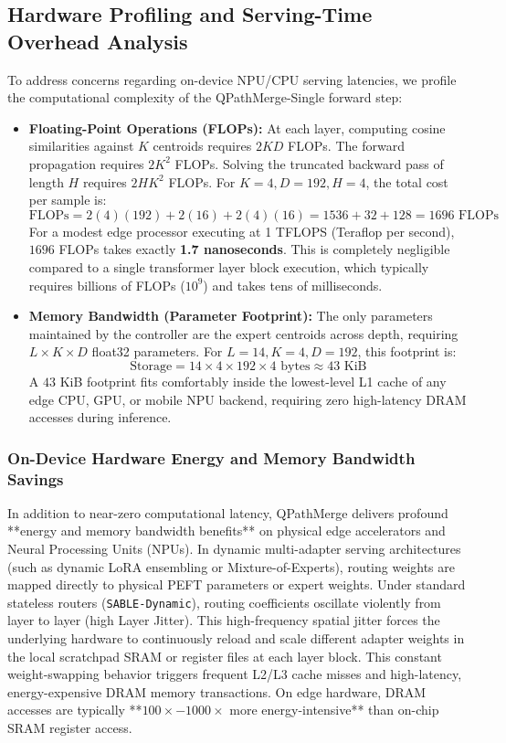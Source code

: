 \subsection{Hardware Profiling and Serving-Time Overhead Analysis}
To address concerns regarding on-device NPU/CPU serving latencies, we profile the computational complexity of the QPathMerge-Single forward step:
\begin{itemize}
    \item \textbf{Floating-Point Operations (FLOPs):} At each layer, computing cosine similarities against $K$ centroids requires $2 K D$ FLOPs. The forward propagation requires $2 K^2$ FLOPs. Solving the truncated backward pass of length $H$ requires $2 H K^2$ FLOPs. For $K=4, D=192, H=4$, the total cost per sample is:
    \begin{equation}
        \text{FLOPs} = 2(4)(192) + 2(16) + 2(4)(16) = 1536 + 32 + 128 = 1696 \text{ FLOPs}
    \end{equation}
    For a modest edge processor executing at 1 TFLOPS (Teraflop per second), $1696$ FLOPs takes exactly \textbf{1.7 nanoseconds}. This is completely negligible compared to a single transformer layer block execution, which typically requires billions of FLOPs ($10^9$) and takes tens of milliseconds.
    \item \textbf{Memory Bandwidth (Parameter Footprint):} The only parameters maintained by the controller are the expert centroids across depth, requiring $L \times K \times D$ float32 parameters. For $L=14, K=4, D=192$, this footprint is:
    \begin{equation}
        \text{Storage} = 14 \times 4 \times 192 \times 4 \text{ bytes} \approx 43 \text{ KiB}
    \end{equation}
    A $43$ KiB footprint fits comfortably inside the lowest-level L1 cache of any edge CPU, GPU, or mobile NPU backend, requiring zero high-latency DRAM accesses during inference.
\end{itemize}

\subsubsection{On-Device Hardware Energy and Memory Bandwidth Savings}
In addition to near-zero computational latency, QPathMerge delivers profound **energy and memory bandwidth benefits** on physical edge accelerators and Neural Processing Units (NPUs). In dynamic multi-adapter serving architectures (such as dynamic LoRA ensembling or Mixture-of-Experts), routing weights are mapped directly to physical PEFT parameters or expert weights.
Under standard stateless routers (\texttt{SABLE-Dynamic}), routing coefficients oscillate violently from layer to layer (high Layer Jitter). This high-frequency spatial jitter forces the underlying hardware to continuously reload and scale different adapter weights in the local scratchpad SRAM or register files at each layer block. This constant weight-swapping behavior triggers frequent L2/L3 cache misses and high-latency, energy-expensive DRAM memory transactions. On edge hardware, DRAM accesses are typically **$100\times - 1000\times$ more energy-intensive** than on-chip SRAM register access.

